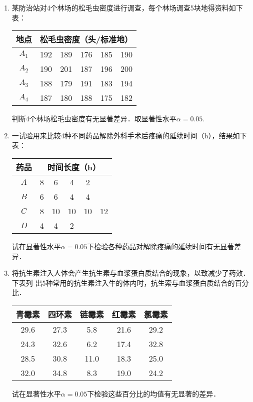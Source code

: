\documentclass[10pt,a4paper]{article}
\begin{document}
\begin{enumerate}
    \item 某防治站对4个林场的松毛虫密度进行调查，每个林场调查5块地得资料如下表：
    \renewcommand{\arraystretch}{1.3}
    \begin{table}[H]\centering
        \begin{tabular}{cccccc}
        \hline
        地点    & \multicolumn{5}{c}{松毛虫密度（头/标准地）} \\ \hline
        $A_1$ & 192  & 189  & 176  & 185  & 190  \\
        $A_2$ & 190  & 201  & 187  & 196  & 200  \\
        $A_3$ & 188  & 179  & 191  & 183  & 194  \\
        $A_4$ & 187  & 180  & 188  & 175  & 182  \\ \hline
        \end{tabular}
        \end{table}
    判断4个林场松毛虫密度有无显著差异．取显著性水平$\alpha=0.05$.
    \renewcommand{\arraystretch}{1.0}




    \item 一试验用来比较4种不同药品解除外科手术后疼痛的延续时间（h），结果如下表：
    \renewcommand{\arraystretch}{1.3}
    \begin{table}[H]\centering
        \begin{tabular}{cccccc}
        \hline
        药品  & \multicolumn{5}{c}{时间长度（h）} \\ \hline
        $A$ & 8   & 6   & 4   & 2   &     \\
        $B$ & 6   & 6   & 4   & 4   &     \\
        $C$ & 8   & 10  & 10  & 10  & 12  \\
        $D$ & 4   & 4   & 2   &     &     \\ \hline
        \end{tabular}
    \end{table}
    \renewcommand{\arraystretch}{1.0}
    试在显著性水平$\alpha=0.05$下检验各种药品对解除疼痛的延续时间有无显著差异．




    \item 将抗生素注入人体会产生抗生素与血浆蛋白质结合的现象，以致减少了药效．下表列
    出5种常用的抗生素注入牛的体内时，抗生索与血浆蛋白质结合的百分比．
    \renewcommand{\arraystretch}{1.3}
    \begin{table}[H]\centering
        \begin{tabular}{ccccc}
        \hline
        青霉素  & 四环素  & 链霉素  & 红霉素  & 氯霉素  \\ \hline
        29.6 & 27.3 & 5.8  & 21.6 & 29.2 \\
        24.3 & 32.6 & 6.2  & 17.4 & 32.8 \\
        28.5 & 30.8 & 11.0 & 18.3 & 25.0 \\
        32.0 & 34.8 & 8.3  & 19.0 & 24.2 \\ \hline
        \end{tabular}
    \end{table}
    \renewcommand{\arraystretch}{1.0}
    试在显著性水平$\alpha=0.05$下检验这些百分比的均值有无显著的差异．




\end{enumerate}
\end{document}
